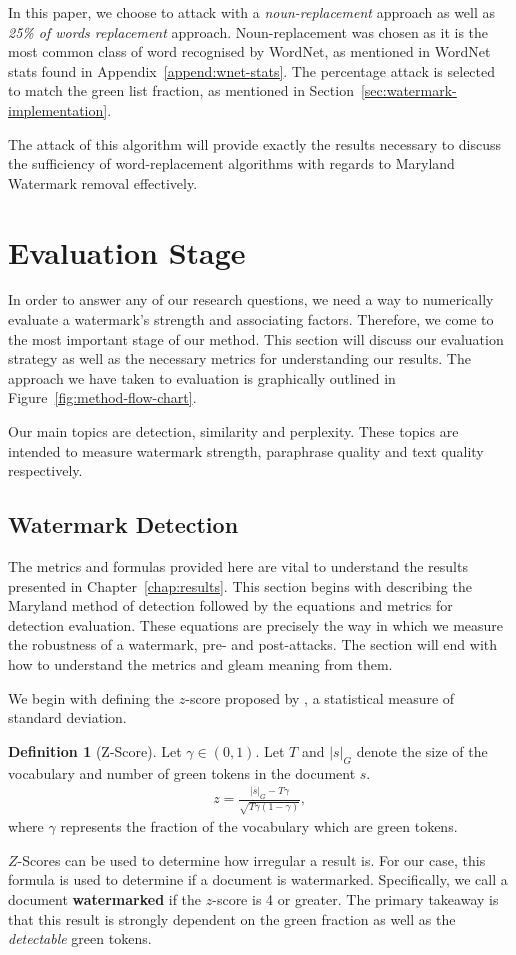 \documentclass{l4proj}
\theoremstyle{definition}
\newtheorem{definition}{Definition}[section]
\begin{document}
        In this paper, we choose to attack with a \emph{noun-replacement} approach as well as \emph{25\% of words replacement} approach. Noun-replacement was chosen as it is the most common class of word recognised by WordNet, as mentioned in WordNet stats found in Appendix~\ref{append:wnet-stats}. The percentage attack is selected to match the green list fraction, as mentioned in Section~\ref{sec:watermark-implementation}. 

        The attack of this algorithm will provide exactly the results necessary to discuss the sufficiency of word-replacement algorithms with regards to Maryland Watermark removal effectively.

\section{Evaluation Stage}
    In order to answer any of our research questions, we need a way to numerically evaluate a watermark's strength and associating factors. Therefore, we come to the most important stage of our method. This section will discuss our evaluation strategy as well as the necessary metrics for understanding our results. The approach we have taken to evaluation is graphically outlined in Figure~\ref{fig:method-flow-chart}. 
    
    Our main topics are detection, similarity and perplexity. These topics are intended to measure watermark strength, paraphrase quality and text quality respectively. 
    
    \subsection{Watermark Detection}
        The metrics and formulas provided here are vital to understand the results presented in Chapter~\ref{chap:results}. This section begins with describing the Maryland method of detection followed by the equations and metrics for detection evaluation. These equations are precisely the way in which we measure the robustness of a watermark, pre- and post-attacks. The section will end with how to understand the metrics and gleam meaning from them.

        We begin with defining the $z$-score proposed by \citet{kirchenbauer2023watermark}, a statistical measure of standard deviation.
        \begin{definition}[Z-Score]
            Let $\gamma \in (0, 1)$. Let $T$ and $|s|_G$ denote the size of the vocabulary and number of green tokens in the document $s$.
            \begin{align*}
                z = \frac{|s|_G - T\gamma}{\sqrt{T\gamma(1 - \gamma)}},
            \end{align*}
            where $\gamma$ represents the fraction of the vocabulary which are green tokens.
        \end{definition}
        $Z$-Scores can be used to determine how irregular a result is. For our case, this formula is used to determine if a document is watermarked. Specifically, we call a document \textbf{watermarked} if the $z$-score is 4 or greater. The primary takeaway is that this result is strongly dependent on the green fraction as well as the \emph{detectable} green tokens. 
\end{document}
